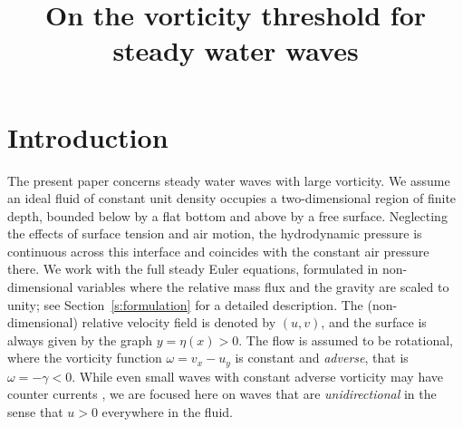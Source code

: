 \documentclass[pdflatex,sn-mathphys-num]{sn-jnl}%
\numberwithin{equation}{section}
\theoremstyle{thmstyleone}
\begin{document}
\title{On the vorticity threshold for steady water waves}

\author*[1]{ }

\author[2]{ }





\maketitle

\section{Introduction} \label{s:introduction}

The present paper concerns steady water waves with large vorticity. We assume an ideal fluid of constant unit density occupies a two-dimensional region of finite depth, bounded below by a flat bottom and above by a free surface. Neglecting the effects of surface tension and air motion, the hydrodynamic pressure is continuous across this interface and coincides with the constant air pressure there. We work with the full steady Euler equations, formulated in non-dimensional variables where the relative mass flux and the gravity are scaled to unity; see Section~\ref{s:formulation} for a detailed description. The (non-dimensional) relative velocity field is denoted by $(u,v)$, and the surface is always given by the graph $y = \eta(x) > 0$. The flow is assumed to be rotational, where the vorticity function $\omega = v_x-u_y$ is constant and \emph{adverse}, that is $\omega = -\gamma < 0$. While even small waves with constant adverse vorticity may have counter currents \cite{Wahlen09,Kozlov2020}, we are focused here on waves that are \emph{unidirectional} in the sense that $u > 0$ everywhere in the fluid.
\end{document}

